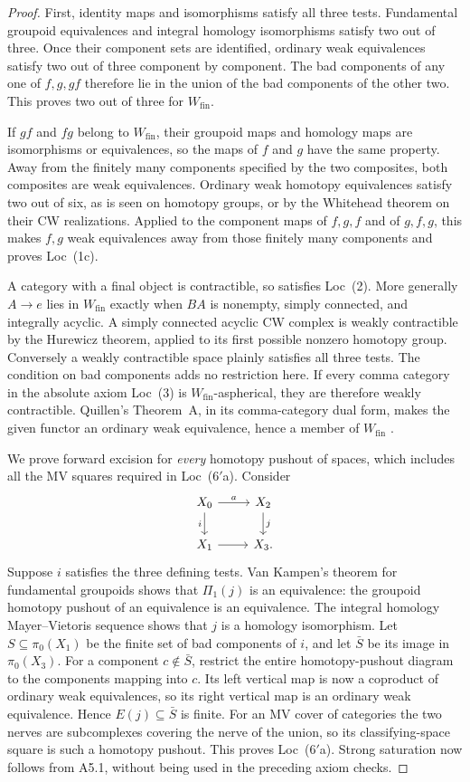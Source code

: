 \begin{proof}
First, identity maps and isomorphisms satisfy all three tests.  Fundamental
groupoid equivalences and integral homology isomorphisms satisfy two out
of three.  Once their component sets are identified, ordinary weak
equivalences satisfy two out of three component by component.  The bad
components of any one of $f,g,gf$ therefore lie in the union of the bad
components of the other two.  This proves two out of three for
$W_{\mathrm{fin}}$.

If $gf$ and $fg$ belong to $W_{\mathrm{fin}}$, their groupoid maps and
homology maps are isomorphisms or equivalences, so the maps of $f$ and
$g$ have the same property.  Away from the finitely many components
specified by the two composites, both composites are weak equivalences.
Ordinary weak homotopy equivalences satisfy two out of six, as is seen
on homotopy groups, or by the Whitehead theorem on their CW realizations.
Applied to the component maps of $f,g,f$ and of $g,f,g$, this makes
$f,g$ weak equivalences away from those finitely many components and
proves Loc~(1c).

A category with a final object is contractible, so satisfies Loc~(2).
More generally $A\to e$ lies in $W_{\mathrm{fin}}$ exactly when $BA$
is nonempty, simply connected, and integrally acyclic.  A simply connected
acyclic CW complex is weakly contractible by the Hurewicz theorem, applied
to its first possible nonzero homotopy group.  Conversely a weakly
contractible space plainly satisfies all three tests.  The condition on
bad components adds no restriction here.  If every comma category in
the absolute axiom Loc~(3) is $W_{\mathrm{fin}}$-aspherical, they are
therefore weakly contractible.  Quillen's Theorem~A, in its comma-category
dual form, makes the given functor an ordinary weak equivalence, hence a
member of $W_{\mathrm{fin}}$
\citep[Section~1, Theorem~A]{Quillen1973A5}.

We prove forward excision for \emph{every} homotopy pushout of spaces,
which includes all the MV squares required in Loc~($6'$a).  Consider
\[
\begin{tikzcd}
 X_0\ar[r,"a"]\ar[d,"i"']&X_2\ar[d,"j"]\\
 X_1\ar[r]&X_3 .
\end{tikzcd}
\]
Suppose $i$ satisfies the three defining tests.  Van Kampen's theorem
for fundamental groupoids shows that $\Pi_1(j)$ is an equivalence:
the groupoid homotopy pushout of an equivalence is an equivalence.
The integral homology Mayer--Vietoris sequence shows that $j$ is a homology
isomorphism.  Let $S\subseteq\pi_0(X_1)$ be the finite set of bad
components of $i$, and let $\bar S$ be its image in $\pi_0(X_3)$.
For a component $c\notin\bar S$, restrict the entire homotopy-pushout
diagram to the components mapping into $c$.  Its left vertical map is
now a coproduct of ordinary weak equivalences, so its right vertical map
is an ordinary weak equivalence.  Hence $E(j)\subseteq\bar S$ is finite.
For an MV cover of categories the two nerves are subcomplexes covering
the nerve of the union, so its classifying-space square is such a homotopy
pushout.  This proves Loc~($6'$a).  Strong saturation now follows from
A5.1, without being used in the preceding axiom checks.


\end{proof}
